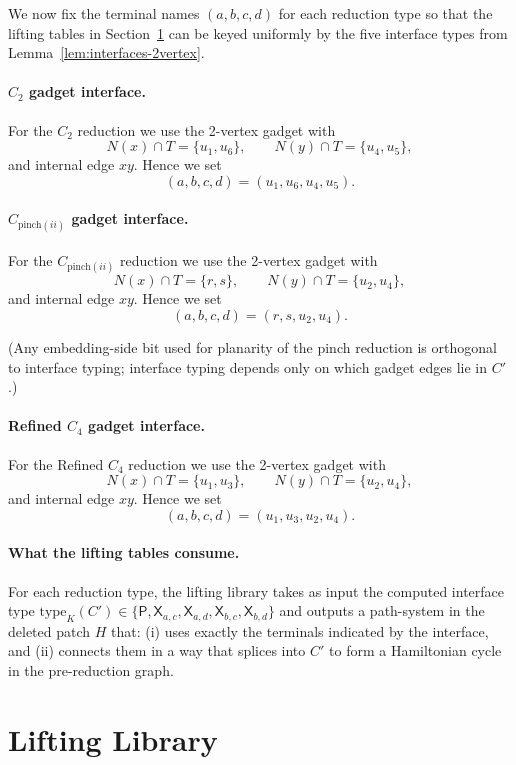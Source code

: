 \documentclass[12pt]{article}
\theoremstyle{definition}
\newcommand{\RefinedCFourGadgetVertices}{2}
\newcommand{\CtwoGadgetVertices}{2}
\newcommand{\PinchGadgetVertices}{2}
\begin{document}
We now fix the terminal names $(a,b,c,d)$ for each reduction type so that the
lifting tables in Section~\ref{sec:lifting-library} can be keyed uniformly by the
five interface types from Lemma~\ref{lem:interfaces-2vertex}.

\paragraph{$C_2$ gadget interface.}
For the $C_2$ reduction we use the \CtwoGadgetVertices-vertex gadget with
\[
N(x)\cap T=\{u_1,u_6\},\qquad N(y)\cap T=\{u_4,u_5\},
\]
and internal edge $xy$.  Hence we set
\[
(a,b,c,d)=(u_1,u_6,u_4,u_5).
\]


\paragraph{$C_{\mathrm{pinch}(ii)}$ gadget interface.}
For the $C_{\mathrm{pinch}(ii)}$ reduction we use the \PinchGadgetVertices-vertex gadget with
\[
N(x)\cap T=\{r,s\},\qquad N(y)\cap T=\{u_2,u_4\},
\]
and internal edge $xy$.  Hence we set
\[
(a,b,c,d)=(r,s,u_2,u_4).
\]

(Any embedding-side bit used for planarity of the pinch reduction is orthogonal
to interface typing; interface typing depends only on which gadget edges lie in
$C'$.)

\paragraph{Refined $C_4$ gadget interface.}
For the Refined $C_4$ reduction we use the \RefinedCFourGadgetVertices-vertex gadget with
\[
N(x)\cap T=\{u_1,u_3\},\qquad N(y)\cap T=\{u_2,u_4\},
\]
and internal edge $xy$.  Hence we set
\[
(a,b,c,d)=(u_1,u_3,u_2,u_4).
\]


\medskip

\paragraph{What the lifting tables consume.}
For each reduction type, the lifting library takes as input the computed
interface type $\mathrm{type}_K(C')\in\{\mathsf{P},\mathsf{X}_{a,c},
\mathsf{X}_{a,d},\mathsf{X}_{b,c},\mathsf{X}_{b,d}\}$ and outputs a path-system
in the deleted patch $H$ that:
(i) uses exactly the terminals indicated by the interface, and
(ii) connects them in a way that splices into $C'$ to form a Hamiltonian cycle in
the pre-reduction graph.

\section{Lifting Library}
\label{sec:lifting-library}
\end{document}
